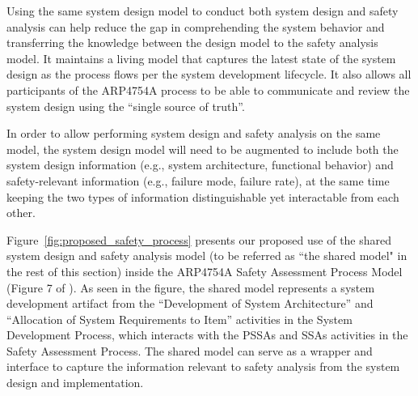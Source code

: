Using the same system design model to conduct both system design and safety analysis can help reduce the gap in comprehending the system behavior and transferring the knowledge between the design model to the safety analysis model. It maintains a living model that captures the latest state of the system design as the process flows per the system development lifecycle.
It also allows all participants of the ARP4754A process to be able to communicate and review the system design using the ``single source of truth''.

In order to allow performing system design and safety analysis on the same model, the system design model will need to be augmented to include both the system design information (e.g., system architecture, functional behavior) and safety-relevant information (e.g., failure mode, failure rate), at the same time keeping the two types of information distinguishable yet interactable from each other.

Figure~\ref{fig:proposed_safety_process}   presents our proposed use of the shared system design and safety analysis model (to be referred as ``the shared model" in the rest of this section) inside the ARP4754A Safety Assessment Process Model (Figure 7 of \cite{SAE:ARP4754A}). As seen in the figure, the shared model represents a system development artifact from the ``Development of System Architecture'' and ``Allocation of System Requirements to Item'' activities in the System Development Process, which interacts with the PSSAs and SSAs activities in the Safety Assessment Process. The shared model can serve as a wrapper and interface to capture the information relevant to safety analysis from the system design and implementation.

